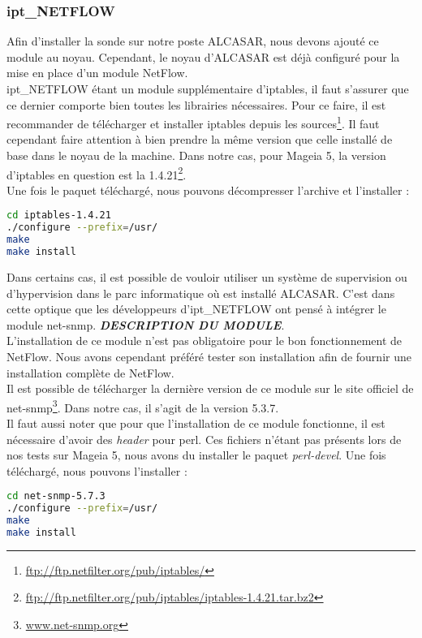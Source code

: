 \subsubsection{ipt\_NETFLOW}
Afin d'installer la sonde sur notre poste ALCASAR, nous devons ajouté ce module au noyau. Cependant, le noyau d'ALCASAR est déjà configuré pour la mise en place d'un module NetFlow.\\
ipt\_NETFLOW étant un module supplémentaire d'iptables, il faut s'assurer que ce dernier comporte bien toutes les librairies nécessaires. Pour ce faire, il est recommander de télécharger et installer iptables depuis les sources\footnote{\url{ftp://ftp.netfilter.org/pub/iptables/}}. Il faut cependant faire attention à bien prendre la même version que celle installé de base dans le noyau de la machine. Dans notre cas, pour Mageia 5, la version d'iptables en question est la 1.4.21\footnote{\url{ftp://ftp.netfilter.org/pub/iptables/iptables-1.4.21.tar.bz2}}.\\
Une fois le paquet téléchargé, nous pouvons décompresser l'archive et l'installer :
\begin{lstlisting}[style=custombash, language=bash]
cd iptables-1.4.21
./configure --prefix=/usr/
make
make install 
\end{lstlisting}
Dans certains cas, il est possible de vouloir utiliser un système de supervision ou d'hypervision dans le parc informatique où est installé ALCASAR. C'est dans cette optique que les développeurs d'ipt\_NETFLOW ont pensé à intégrer le module net-snmp. \textbf{\textit{DESCRIPTION DU MODULE}}.\\
L'installation de ce module n'est pas obligatoire pour le bon fonctionnement de NetFlow. Nous avons cependant préféré tester son installation afin de fournir une installation complète de NetFlow.\\
Il est possible de télécharger la dernière version de ce module sur le site officiel de net-snmp\footnote{\url{www.net-snmp.org}}. Dans notre cas, il s'agit de la version 5.3.7.\\
Il faut aussi noter que pour que l'installation de ce module fonctionne, il est nécessaire d'avoir des \textit{header} pour perl. Ces fichiers n'étant pas présents lors de nos tests sur Mageia 5, nous avons du installer le paquet \textit{perl-devel}.
\newpage
Une fois téléchargé, nous pouvons l'installer :
\begin{lstlisting}[language=bash,style=custombash]
cd net-snmp-5.7.3
./configure --prefix=/usr/
make
make install
\end{lstlisting}
